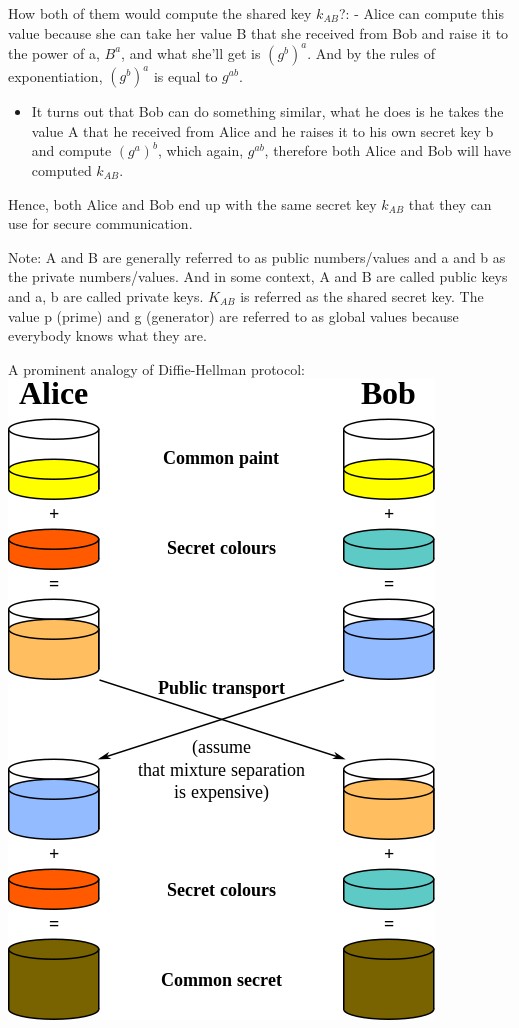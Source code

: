 \documentclass[11pt]{article}
\makeatletter
\def\maxwidth{\ifdim\Gin@nat@width>\linewidth\linewidth
    \else\Gin@nat@width\fi}
\let\Oldincludegraphics\includegraphics
\renewcommand{\includegraphics}[1]{\Oldincludegraphics[width=.8\maxwidth]{#1}}
\providecommand{\tightlist}{%
      \setlength{\itemsep}{0pt}\setlength{\parskip}{0pt}}
\makeatother
\begin{document}
How both of them would compute the shared key \(k_{AB}\)?: - Alice can
compute this value because she can take her value B that she received
from Bob and raise it to the power of a, \(B^{a}\), and what she'll get
is \((g^{b})^{a}\). And by the rules of exponentiation, \((g^{b})^{a}\)
is equal to \(g^{ab}\).

\begin{itemize}
\tightlist
\item
  It turns out that Bob can do something similar, what he does is he
  takes the value A that he received from Alice and he raises it to his
  own secret key b and compute \((g^{a})^{b}\), which again, \(g^{ab}\),
  therefore both Alice and Bob will have computed \(k_{AB}\).
\end{itemize}

Hence, both Alice and Bob end up with the same secret key \(k_{AB}\)
that they can use for secure communication.

Note: A and B are generally referred to as public numbers/values and a
and b as the private numbers/values. And in some context, A and B are
called public keys and a, b are called private keys. \(K_{AB}\) is
referred as the shared secret key. The value p (prime) and g (generator)
are referred to as global values because everybody knows what they are.

A prominent analogy of Diffie-Hellman protocol:
\includegraphics{./Images/DH-analogy.png}
\end{document}
